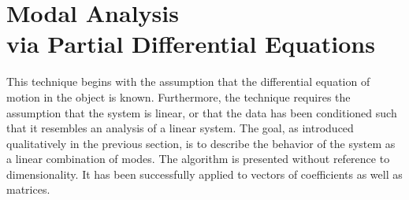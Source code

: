 \documentclass[a4paper,10pt]{report}
\numberwithin{equation}{section}
\begin{document}
\section{Modal Analysis \\via Partial Differential Equations}\label{sec:PDEmodes}

This technique begins with the assumption that the differential equation of motion in the object is known. Furthermore, the technique requires the assumption that the system is linear, or that the data has been conditioned such that it resembles an analysis of a linear system. The goal, as introduced qualitatively in the previous section, is to describe the behavior of the system as a linear combination of modes. The algorithm is presented without reference to dimensionality. It has been successfully applied to vectors of coefficients as well as matrices. \cite[p.~317]{Strang2009}
\end{document}
